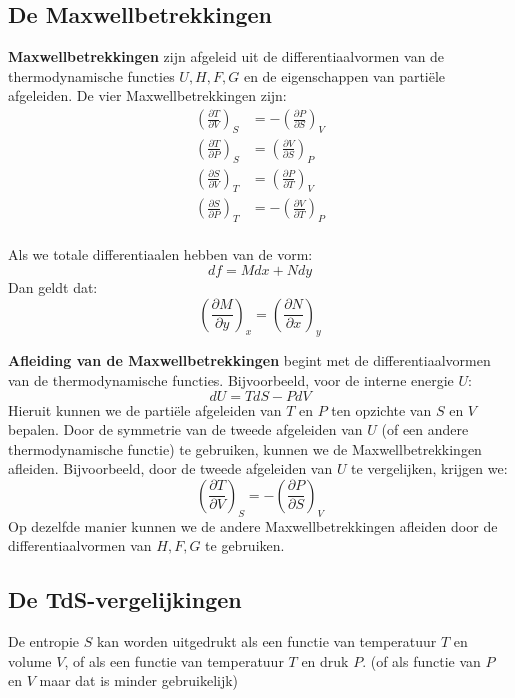 \subsection{De Maxwellbetrekkingen}
\begin{derivation}
\textbf{Maxwellbetrekkingen} zijn afgeleid uit de differentiaalvormen van de thermodynamische functies \(U, H, F, G\) en de eigenschappen van partiële afgeleiden. De vier Maxwellbetrekkingen zijn:
\begin{align*}
\left(\frac{\partial T}{\partial V}\right)_S &= -\left(\frac{\partial P}{\partial S}\right)_V \\
\left(\frac{\partial T}{\partial P}\right)_S &= \left(\frac{\partial V}{\partial S}\right)_P \\
\left(\frac{\partial S}{\partial V}\right)_T &= \left(\frac{\partial P}{\partial T}\right)_V \\
\left(\frac{\partial S}{\partial P}\right)_T &= -\left(\frac{\partial V}{\partial T}\right)_P \\
\end{align*}
\end{derivation}   
Als we totale differentiaalen hebben van de vorm:
\[df = Mdx + Ndy\]
Dan geldt dat:
\[\left(\frac{\partial M}{\partial y}\right)_x = \left(\frac{\partial N}{\partial x}\right)_y\]
\begin{derivation}
\textbf{Afleiding van de Maxwellbetrekkingen} begint met de differentiaalvormen van de thermodynamische functies. Bijvoorbeeld, voor de interne energie \(U\):
\[
dU = TdS - PdV
\]
Hieruit kunnen we de partiële afgeleiden van \(T\) en \(P\) ten opzichte van \(S\) en \(V\) bepalen. Door de symmetrie van de tweede afgeleiden van \(U\) (of een andere thermodynamische functie) te gebruiken, kunnen we de Maxwellbetrekkingen afleiden. Bijvoorbeeld, door de tweede afgeleiden van \(U\) te vergelijken, krijgen we:
\[\left(\frac{\partial T}{\partial V}\right)_S = -\left(\frac{\partial P}{\partial S}\right)_V\]
Op dezelfde manier kunnen we de andere Maxwellbetrekkingen afleiden door de differentiaalvormen van \(H, F, G\) te gebruiken.
\end{derivation}    
\subsection{De TdS-vergelijkingen}


De entropie \(S\) kan worden uitgedrukt als een functie van temperatuur \(T\) en volume \(V\), of als een functie van temperatuur \(T\) en druk \(P\). (of als functie van \(P\) en \(V\) maar dat is minder gebruikelijk)

